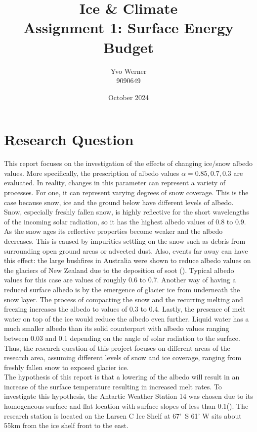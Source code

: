 \documentclass{article}
\title{Ice \& Climate \\ \vspace{1em} \large Assignment 1: Surface Energy Budget \normalsize}
\author{Yvo Werner\\ 9090649 }
\date{October 2024}
\begin{document}
\maketitle

\section{Research Question}
This report focuses on the investigation of the effects of changing ice/snow albedo values. 
More specifically, the prescription of albedo values $\alpha= 0.85, 0.7, 0.3$ are evaluated. 
In reality, changes in this parameter can represent a variety of processes. 
For one, it can represent varying degrees of snow coverage. 
This is the case because snow, ice and the ground below have different levels of albedo. 
Snow, especially freshly fallen snow, is highly reflective for the short wavelengths of the incoming solar radiation, so it has the highest albedo values of 0.8 to 0.9. 
As the snow ages its reflective properties become weaker and the albedo decreases. This is caused by impurities settling on the snow such as debris from surrounding open ground areas or advected dust. 
Also, events far away can have this effect: the large bushfires in Australia were shown to reduce albedo values on the glaciers of New Zealand due to the deposition of soot (\cite{Pu.2021}). 
Typical albedo values for this case are values of roughly 0.6 to 0.7. 
Another way of having a reduced surface albedo is by the emergence of glacier ice from underneath the snow layer. 
The process of compacting the snow and the recurring melting and freezing increases the albedo to values of 0.3 to 0.4.
Lastly, the presence of melt water on top of the ice would reduce the albedo even further. 
Liquid water has a much smaller albedo than its solid counterpart with albedo values ranging between 0.03 and 0.1 depending on the angle of solar radiation to the surface.\\
Thus, the research question of this project focuses on different areas of the research area, assuming different levels of snow and ice coverage, ranging from freshly fallen snow to exposed glacier ice. \\
The hypothesis of this report is that a lowering of the albedo will result in an increase of the surface temperature resulting in increased melt rates. 
To investigate this hypothesis, the Antartic Weather Station 14 was chosen due to its homogeneous surface and flat location with surface slopes of less than 0.1\textdegree (\cite{KuipersMunneke.2012}).
The research station is located on the Larsen C Ice Shelf at 67'~S 61' W sits about 55km from the ice shelf front to the east.
\end{document}

